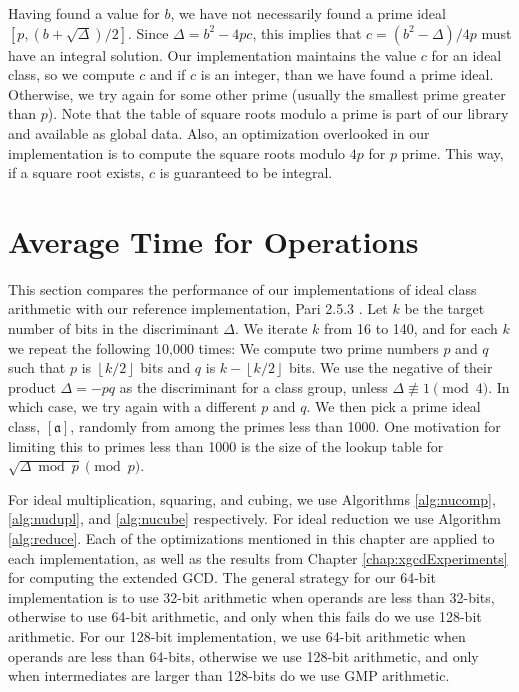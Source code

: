 \documentclass{ucalgthes1}
\theoremstyle{definition}
\newcommand{\floor}[1]{\left\lfloor #1 \right\rfloor}
\newcommand{\Pari}{Pari 2.5.3}
\begin{document}
Having found a value for $b$, we have not necessarily found a prime ideal $[p, (b + \sqrt\Delta)/2]$.  Since $\Delta = b^2 - 4pc$, this implies that $c = (b^2 - \Delta)/4p$ must have an integral solution.  Our implementation maintains the value $c$ for an ideal class, so we compute $c$ and if $c$ is an integer, than we have found a prime ideal.  Otherwise, we try again for some other prime (usually the smallest prime greater than $p$).  Note that the table of square roots modulo a prime is part of our library and available as global data.  Also, an optimization overlooked in our implementation is to compute the square roots modulo $4p$ for $p$ prime.  This way, if a square root exists, $c$ is guaranteed to be integral.


\section{Average Time for Operations}
\label{sec:idealResults}

This section compares the performance of our implementations of ideal class arithmetic with our reference implementation, \Pari{} \cite{PariGP}.   Let $k$ be the target number of bits in the discriminant $\Delta$.  We iterate $k$ from 16 to 140, and for each $k$ we repeat the following 10,000 times: We compute two prime numbers $p$ and $q$ such that $p$ is $\floor{k/2}$ bits and $q$ is $k-\floor{k/2}$ bits.  We use the negative of their product $\Delta = -pq$ as the discriminant for a class group, unless $\Delta \not\equiv 1 \pmod 4$. In which case, we try again with a different $p$ and $q$.  We then pick a prime ideal class, $[\mathfrak a]$, randomly from among the primes less than 1000.  One motivation for limiting this to primes less than 1000 is the size of the lookup table for $\sqrt{\Delta \bmod p} \pmod p$.

For ideal multiplication, squaring, and cubing, we use Algorithms \ref{alg:nucomp}, \ref{alg:nudupl}, and \ref{alg:nucube} respectively.  For ideal reduction we use Algorithm \ref{alg:reduce}.  Each of the optimizations mentioned in this chapter are applied to each implementation, as well as the results from Chapter \ref{chap:xgcdExperiments} for computing the extended GCD.   The general strategy for our 64-bit implementation is to use 32-bit arithmetic when operands are less than 32-bits, otherwise to use 64-bit arithmetic, and only when this fails do we use 128-bit arithmetic.  For our 128-bit implementation, we use 64-bit arithmetic when operands are less than 64-bits, otherwise we use 128-bit arithmetic, and only when intermediates are larger than 128-bits do we use GMP arithmetic.
\end{document}
